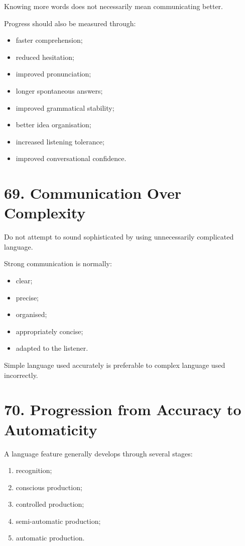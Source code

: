 Knowing more words does not necessarily mean communicating better.

Progress should also be measured through:

\begin{itemize}
    \item faster comprehension;
    \item reduced hesitation;
    \item improved pronunciation;
    \item longer spontaneous answers;
    \item improved grammatical stability;
    \item better idea organisation;
    \item increased listening tolerance;
    \item improved conversational confidence.
\end{itemize}

\section*{69. Communication Over Complexity}

Do not attempt to sound sophisticated by using unnecessarily complicated language.

Strong communication is normally:

\begin{itemize}
    \item clear;
    \item precise;
    \item organised;
    \item appropriately concise;
    \item adapted to the listener.
\end{itemize}

Simple language used accurately is preferable to complex language used incorrectly.

\section*{70. Progression from Accuracy to Automaticity}

A language feature generally develops through several stages:

\begin{enumerate}
    \item recognition;
    \item conscious production;
    \item controlled production;
    \item semi-automatic production;
    \item automatic production.
\end{enumerate}

